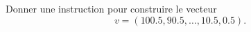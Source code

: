 \begin{exercice}\label{exoSC_serie1-0002}

	Donner une instruction pour construire le vecteur
	\begin{equation}
		v=(100.5,90.5,\ldots,10.5,0.5).
	\end{equation}

\end{exercice}
